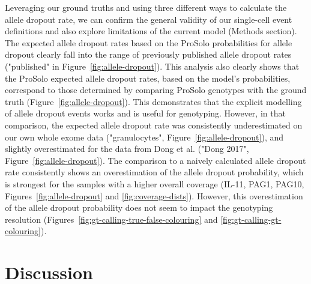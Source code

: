 \documentclass[12pt,inline]{wlscirep}
\begin{document}
Leveraging our ground truths and using three different ways to calculate the allele dropout rate, we can confirm the general validity of our single-cell event definitions and also explore limitations of the current model (Methods section).
The expected allele dropout rates based on the ProSolo probabilities for allele dropout clearly fall into the range of previously published allele dropout rates\cite{wang_clonal_2014,hou_single-cell_2012,xu_single-cell_2012,ling_evaluation_2009,spits_whole-genome_2006,spits_optimization_2006,renwick_proof_2006,lodato_somatic_2015} ("published" in Figure~\ref{fig:allele-dropout}).
This analysis also clearly shows that the ProSolo expected allele dropout rates, based on the model's probabilities, correspond to those determined by comparing ProSolo genotypes with the ground truth (Figure~\ref{fig:allele-dropout}).
This demonstrates that the explicit modelling of allele dropout events works and is useful for genotyping.
However, in that comparison, the expected allele dropout rate was consistently underestimated on our own whole exome data ("granulocytes", Figure~\ref{fig:allele-dropout}), and slightly overestimated for the data from Dong et al.\cite{dong_accurate_2017} ("Dong 2017", Figure~\ref{fig:allele-dropout}).
The comparison to a naively calculated allele dropout rate consistently shows an overestimation of the allele dropout probability, which is strongest for the samples with a higher overall coverage (IL-11, PAG1, PAG10, Figures~\ref{fig:allele-dropout} and \ref{fig:coverage-dists}).
However, this overestimation of the allele dropout probability does not seem to impact the genotyping resolution (Figures~\ref{fig:gt-calling-true-false-colouring} and \ref{fig:gt-calling-gt-colouring}).


\section*{Discussion}
\end{document}
